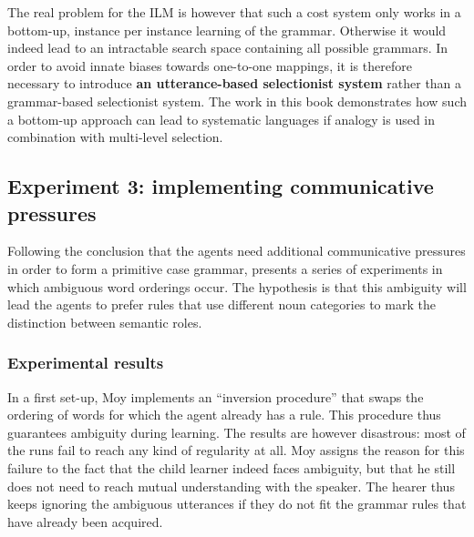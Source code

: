 The real problem for the ILM is however that such a cost system only works in a bottom-up, instance per instance learning of the grammar. Otherwise it would indeed lead to an intractable search space containing all possible grammars. In order to avoid innate biases towards one-to-one mappings, it is therefore necessary to introduce {\bfseries an utterance-based selectionist system} rather than a grammar-based selectionist system. The work in this book demonstrates how such a bottom-up approach can lead to systematic languages if analogy is used in combination with multi-level selection.

\subsection{Experiment 3: implementing communicative pressures}

Following the conclusion that the agents need additional communicative pressures in order to form a primitive case grammar, \citet[chapter 6]{moy06case} presents a series of experiments in which ambiguous word orderings occur. The hypothesis is that this ambiguity will lead the agents to prefer rules that use different noun categories to mark the distinction between semantic roles.


\subsubsection{Experimental results}
 In a first set-up, Moy implements an ``inversion procedure'' that swaps the ordering of words for which the agent already has a rule. This procedure thus guarantees ambiguity during learning. The results are however disastrous: most of the runs fail to reach any kind of regularity at all. Moy assigns the reason for this failure to the fact that the child learner indeed faces ambiguity, but that he still does not need to reach mutual understanding with the speaker. The hearer thus keeps ignoring the ambiguous utterances if they do not fit the grammar rules that have already been acquired.

